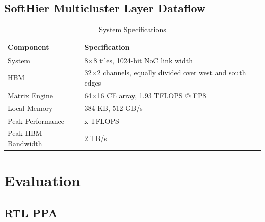 \documentclass[conference]{IEEEtran}
\begin{document}
\subsection{SoftHier Multicluster Layer Dataflow}
\begin{table}[h]
\centering
\caption{System Specifications}
\label{tab:system_specifications}
\begin{tabular}{ll}
\hline
\textbf{Component} & \textbf{Specification} \\
\hline
System & 8$\times$8 tiles, 1024-bit NoC link width \\
HBM & 32$\times$2 channels, equally divided over west and south edges \\
Matrix Engine & 64$\times$16 CE array, 1.93 TFLOPS @ FP8 \\
Local Memory & 384 KB, 512 GB/s \\
Peak Performance & x TFLOPS \\
Peak HBM Bandwidth & 2 TB/s \\
\hline
\end{tabular}
\end{table}















\begin{figure}[h]
  \centering
  \caption{}
  \label{fig:roofline}
\end{figure}

\section{Evaluation}
\subsection{RTL PPA}
\end{document}
